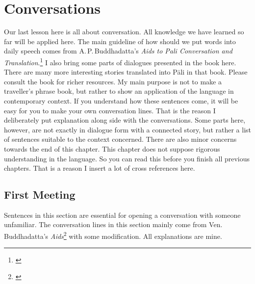 \chapter{Conversations}\label{chap:conver}

Our last lesson here is all about conversation. All knowledge we have learned so far will be applied here. The main guideline of how should we put words into daily speech comes from A.\,P.\,Buddhadatta's \emph{Aids to Pali Conversation and Translation}.\footnote{\citealp{buddhadatta:aids}} I also bring some parts of dialogues presented in the book here. There are many more interesting stories translated into P\=ali in that book. Please consult the book for richer resources. My main purpose is not to make a traveller's phrase book, but rather to show an application of the language in contemporary context. If you understand how these sentences come, it will be easy for you to make your own conversation lines. That is the reason I deliberately put explanation along side with the conversations. Some parts here, however, are not exactly in dialogue form with a connected story, but rather a list of sentences suitable to the context concerned. There are also minor concerns towards the end of this chapter. This chapter does not suppose rigorous understanding in the language. So you can read this before you finish all previous chapters. That is a reason I insert a lot of cross references here.

{}
\section*{First Meeting}

Sentences in this section are essential for opening a conversation with someone unfamiliar. The conversation lines in this section mainly come from Ven.\,Buddhadatta's \emph{Aids}\footnote{\citealp[pp.~47--50]{buddhadatta:aids}} with some modification. All explanations are mine.

